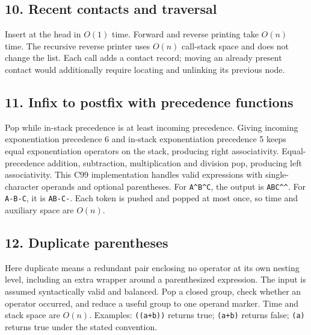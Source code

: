 \documentclass[11pt,a4paper]{article}
\begin{document}
\noindent\begin{minipage}{\linewidth}\subsection*{10. Recent contacts and traversal}
Insert at the head in $O(1)$ time. Forward and reverse printing take $O(n)$ time. The recursive reverse printer uses $O(n)$ call-stack space and does not change the list. Each call adds a contact record; moving an already present contact would additionally require locating and unlinking its previous node.

\end{minipage}\par\medskip
\noindent\begin{minipage}{\linewidth}\subsection*{11. Infix to postfix with precedence functions}
Pop while in-stack precedence is at least incoming precedence. Giving incoming exponentiation precedence 6 and in-stack exponentiation precedence 5 keeps equal exponentiation operators on the stack, producing right associativity. Equal-precedence addition, subtraction, multiplication and division pop, producing left associativity. This C99 implementation handles valid expressions with single-character operands and optional parentheses.
For \texttt{A\^{}B\^{}C}, the output is \texttt{ABC\^{}\^{}}. For \texttt{A-B-C}, it is \texttt{AB-C-}. Each token is pushed and popped at most once, so time and auxiliary space are $O(n)$.
\end{minipage}\par\medskip
\noindent\begin{minipage}{\linewidth}\subsection*{12. Duplicate parentheses}
Here duplicate means a redundant pair enclosing no operator at its own nesting level, including an extra wrapper around a parenthesized expression. The input is assumed syntactically valid and balanced. Pop a closed group, check whether an operator occurred, and reduce a useful group to one operand marker. Time and stack space are $O(n)$.
Examples: \texttt{((a+b))} returns true; \texttt{(a+b)} returns false; \texttt{(a)} returns true under the stated convention.
\end{minipage}\par\medskip
\end{document}

